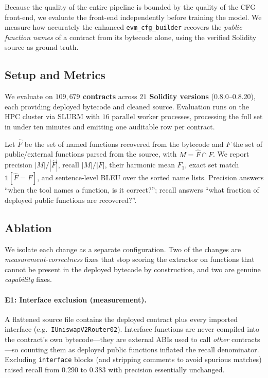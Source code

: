 \documentclass{stylefiles/capstone}
\begin{document}
Because the quality of the entire pipeline is bounded by the quality of the CFG
front-end, we evaluate the front-end independently before training the model. We
measure how accurately the enhanced \texttt{evm\_cfg\_builder} recovers the
\emph{public function names} of a contract from its bytecode alone, using the
verified Solidity source as ground truth.

\subsection{Setup and Metrics}

We evaluate on \textbf{$109{,}679$ contracts} across \textbf{$21$ Solidity
versions} (0.8.0--0.8.20), each providing deployed bytecode and cleaned source.
Evaluation runs on the HPC cluster via SLURM with $16$ parallel worker processes,
processing the full set in under ten minutes and emitting one auditable row per
contract.

Let $\widehat{F}$ be the set of named functions recovered from the bytecode and
$F$ the set of public/external functions parsed from the source, with
$M=\widehat{F}\cap F$. We report precision $|M|/|\widehat{F}|$, recall $|M|/|F|$,
their harmonic mean $F_1$, exact set match $\mathbb{1}[\widehat{F}=F]$, and
sentence-level BLEU over the sorted name lists. Precision answers ``when the tool
names a function, is it correct?''; recall answers ``what fraction of deployed
public functions are recovered?''.

\subsection{Ablation}

We isolate each change as a separate configuration. Two of the changes are
\emph{measurement-correctness} fixes that stop scoring the extractor on functions
that cannot be present in the deployed bytecode by construction, and two are
genuine \emph{capability} fixes.

\paragraph{E1: Interface exclusion (measurement).}
A flattened source file contains the deployed contract plus every imported
interface (e.g.\ \texttt{IUniswapV2Router02}). Interface functions are never
compiled into the contract's own bytecode—they are external ABIs used to call
\emph{other} contracts—so counting them as deployed public functions inflated the
recall denominator. Excluding \texttt{interface} blocks (and stripping comments to
avoid spurious matches) raised recall from $0.290$ to $0.383$ with precision
essentially unchanged.
\end{document}
